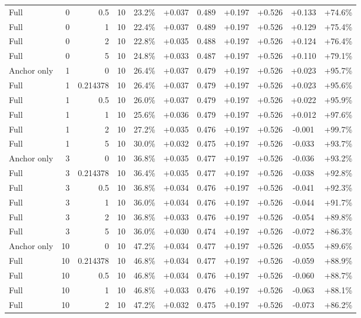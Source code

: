 \begin{table}[htbp]
\begin{tabular}{lrrrccccccc}
Full & 0 & 0.5 & 10 & 23.2\% & +0.037 & 0.489 & +0.197 & +0.526 & +0.133 & +74.6\% \\
Full & 0 & 1 & 10 & 22.4\% & +0.037 & 0.489 & +0.197 & +0.526 & +0.129 & +75.4\% \\
Full & 0 & 2 & 10 & 22.8\% & +0.035 & 0.488 & +0.197 & +0.526 & +0.124 & +76.4\% \\
Full & 0 & 5 & 10 & 24.8\% & +0.033 & 0.487 & +0.197 & +0.526 & +0.110 & +79.1\% \\
Anchor only & 1 & 0 & 10 & 26.4\% & +0.037 & 0.479 & +0.197 & +0.526 & +0.023 & +95.7\% \\
Full & 1 & 0.214378 & 10 & 26.4\% & +0.037 & 0.479 & +0.197 & +0.526 & +0.023 & +95.6\% \\
Full & 1 & 0.5 & 10 & 26.0\% & +0.037 & 0.479 & +0.197 & +0.526 & +0.022 & +95.9\% \\
Full & 1 & 1 & 10 & 25.6\% & +0.036 & 0.479 & +0.197 & +0.526 & +0.012 & +97.6\% \\
Full & 1 & 2 & 10 & 27.2\% & +0.035 & 0.476 & +0.197 & +0.526 & -0.001 & +99.7\% \\
Full & 1 & 5 & 10 & 30.0\% & +0.032 & 0.475 & +0.197 & +0.526 & -0.033 & +93.7\% \\
Anchor only & 3 & 0 & 10 & 36.8\% & +0.035 & 0.477 & +0.197 & +0.526 & -0.036 & +93.2\% \\
Full & 3 & 0.214378 & 10 & 36.4\% & +0.035 & 0.477 & +0.197 & +0.526 & -0.038 & +92.8\% \\
Full & 3 & 0.5 & 10 & 36.8\% & +0.034 & 0.476 & +0.197 & +0.526 & -0.041 & +92.3\% \\
Full & 3 & 1 & 10 & 36.0\% & +0.034 & 0.476 & +0.197 & +0.526 & -0.044 & +91.7\% \\
Full & 3 & 2 & 10 & 36.8\% & +0.033 & 0.476 & +0.197 & +0.526 & -0.054 & +89.8\% \\
Full & 3 & 5 & 10 & 36.0\% & +0.030 & 0.474 & +0.197 & +0.526 & -0.072 & +86.3\% \\
Anchor only & 10 & 0 & 10 & 47.2\% & +0.034 & 0.477 & +0.197 & +0.526 & -0.055 & +89.6\% \\
Full & 10 & 0.214378 & 10 & 46.8\% & +0.034 & 0.477 & +0.197 & +0.526 & -0.059 & +88.9\% \\
Full & 10 & 0.5 & 10 & 46.8\% & +0.034 & 0.476 & +0.197 & +0.526 & -0.060 & +88.7\% \\
Full & 10 & 1 & 10 & 46.8\% & +0.033 & 0.476 & +0.197 & +0.526 & -0.063 & +88.1\% \\
Full & 10 & 2 & 10 & 47.2\% & +0.032 & 0.475 & +0.197 & +0.526 & -0.073 & +86.2\% \\

\end{tabular}
\end{table}
